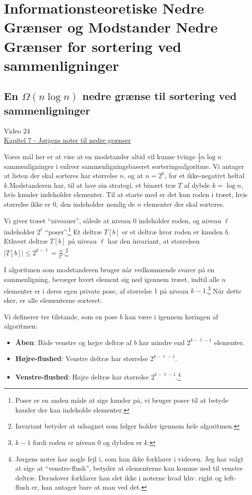 \chapter{Informationsteoretiske Nedre Grænser og Modstander Nedre Grænser for sortering ved sammenligninger}

\section{En $\Omega (n \log n)$ nedre grænse til sortering ved sammenligninger}%
\label{sec:sorteringsalgoritmesammenligninger}

\begin{note}[Kilder]
	Video 24 \\
	\href{https://imada.sdu.dk/u/jbj/DM553/LBnoteJBJ21.pdf}{Kapitel 7 - Jørgens noter til nedre grænser}
\end{note}

Vores mål her er at vise at en modstander altid vil kunne tvinge $\frac{1}{2}n \log n$ sammenligninger i enhver sammenligningsbaseret sorteringsalgoritme. Vi antager at listen der skal sorteres har størrelse $n$, og at $n = 2^{k}$, for et ikke-negativt heltal $k$.Modstanderen har, til at lave sin strategi, et binært træ $T$ af dybde $k = \log n$, hvis knuder indeholder elementer. Til at starte med er det kun roden i træet, hvis størrelse ikke er 0, den indeholder nemlig de $n$ elementer der skal sorteres.

Vi giver træet ``niveauer'', sålede at niveau 0 indeholder roden, og niveau $\ell$ indeholder $2^{\ell}$ ``poser''.\footnote{Poser er en anden måde at sige knuder på, vi bruger poser til at betyde knuder der kan indeholde elementer.} Et deltræ $T[b]$ er et deltræ hvor roden er knuden $b$. Ethvert deltræ $T[b]$ på niveau $\ell$ har den invariant, at størrelsen $|T[b]| \le 2^{k-\ell} = \frac{n}{2^{\ell}}$.\footnote{Invariant betyder at udsagnet som følger holder igennem hele algoritmen.}

I algoritmen som modstanderen bruger når vedkommende svarer på en sammenligning, bevæger hvert element sig ned igennem træet, indtil alle $n$ elementer er i deres egen private pose, af størrelse $1$ på niveau $k-1$.\footnote{$k-1$ fordi roden er niveau $0$ og dybden er $k$.} Når dette sker, er alle elementerne sorteret.

Vi definerer tre tilstande, som en pose $b$ kan være i igennem køringen af algoritmen:
\begin{itemize}
	\item \textbf{Åben}: Både venstre og højre deltræ af $b$  har mindre end $2^{k-\ell-1}$ elementer.
	\item \textbf{Højre-flushed}: Venstre deltræ har størrelse $2^{k-\ell-1}$.
	\item \textbf{Venstre-flushed}: Højre deltræ har størrelse $2^{k-\ell-1}$.\footnote{Jørgens noter har nogle fejl i, som han ikke forklarer i videoen. Jeg har valgt at sige at ``venstre-flush'', betyder at elementerne kan komme ned til venstre deltræ. Derudover forklarer han slet ikke i noterne hvad hhv. right og left-flush er, han antager bare at man ved det.}
\end{itemize}

